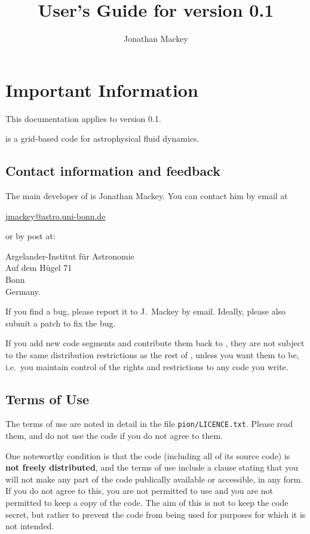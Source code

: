 \documentclass[a4paper,11pt]{report}
\title{User's Guide for \pion{} version 0.1}
\author{Jonathan Mackey}
\begin{document}
\maketitle


\section{Important Information}
This documentation applies to \pion{} version 0.1.

\pion{} is a grid-based code for astrophysical fluid dynamics.

\subsection{Contact information and feedback}
The main developer of \pion{} is Jonathan Mackey.
You can contact him by email at

\hangindent=0.5cm
\quad \url{jmackey@astro.uni-bonn.de}

or by post at:

\hangindent=0.5cm
\quad Argelander-Institut f\"ur Astronomie\\
\quad Auf dem H\"ugel 71\\
 Bonn\\
\quad Germany.

If you find a bug, please report it to J.~Mackey by email.
Ideally, please also submit a patch to fix the bug.

If you add new code segments and contribute them back to \pion{}, they are not subject to the same distribution restrictions as the rest of \pion{}, unless you want them to be, i.e.~you maintain control of the rights and restrictions to any code you write.


\subsection{Terms of Use}
The terms of use are noted in detail in the file \texttt{pion/LICENCE.txt}.
Please read them, and do not use the code if you do not agree to them.

One noteworthy condition is that the code \pion{} (including all of its source code) is \textbf{not freely distributed}, and the terms of use include a clause stating that you will not make any part of the code publically available or accessible, in any form.
If you do not agree to this, you are not permitted to use \pion{} and you are not permitted to keep a copy of the code.
The aim of this is not to keep the code secret, but rather to prevent the code from being used for purposes for which it is not intended.
\end{document}
